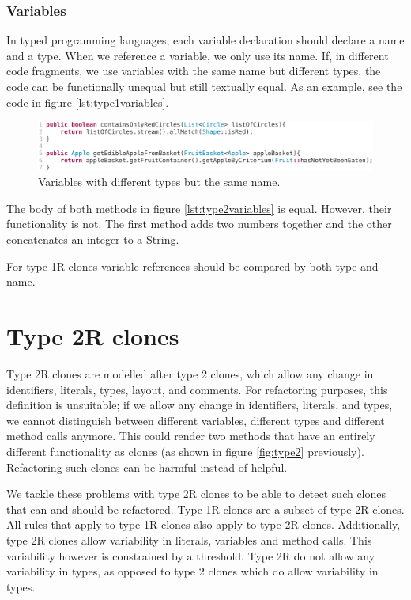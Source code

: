 \subsubsection{Variables}
In typed programming languages, each variable declaration should declare a name and a type. When we reference a variable, we only use its name. If, in different code fragments, we use variables with the same name but different types, the code can be functionally unequal but still textually equal. As an example, see the code in figure \ref{lst:type1variables}.

\begin{figure}[H]
  \includegraphics[width=1\columnwidth]{img/type2}
  \caption{Variables with different types but the same name.}
  \label{fig:type1variables}
\end{figure}

The body of both methods in figure \ref{lst:type2variables} is equal. However, their functionality is not. The first method adds two numbers together and the other concatenates an integer to a String.

For type 1R clones variable references should be compared by both type and name.

\section{Type 2R clones}
Type 2R clones are modelled after type 2 clones, which allow any change in identifiers, literals, types, layout, and comments. For refactoring purposes, this definition is unsuitable; if we allow any change in identifiers, literals, and types, we cannot distinguish between different variables, different types and different method calls anymore. This could render two methods that have an entirely different functionality as clones (as shown in figure \ref{fig:type2} previously). Refactoring such clones can be harmful instead of helpful.

We tackle these problems with type 2R clones to be able to detect such clones that can and should be refactored. Type 1R clones are a subset of type 2R clones. All rules that apply to type 1R clones also apply to type 2R clones. Additionally, type 2R clones allow variability in literals, variables and method calls. This variability however is constrained by a threshold. Type 2R do not allow any variability in types, as opposed to type 2 clones which do allow variability in types.

